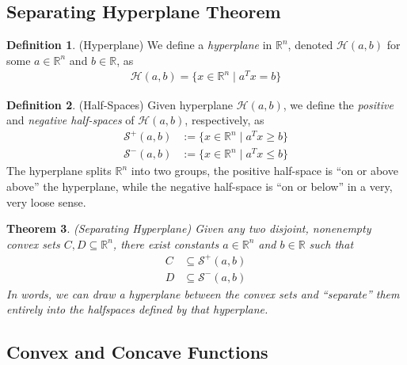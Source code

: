 \documentclass[12pt]{article}
\numberwithin{equation}{section} %
\theoremstyle{plain}
\newtheorem{thm}{Theorem}[section]
\theoremstyle{definition}
\newtheorem{defn}[thm]{Definition}
\theoremstyle{remark}
\newcommand{\R}{\mathbb{R}}
\newcommand{\Rn}{\mathbb{R}^n}
\begin{document}
\subsection{Separating Hyperplane Theorem}

\begin{defn}{(Hyperplane)}
We define a \emph{hyperplane} in $\Rn$, denoted $\mathcal{H}(a,b)$
for some $a\in \Rn$ and $b\in \R$, as
\begin{align*}
  \mathcal{H}(a,b) = \{x\in\Rn \; | \; a^Tx = b\}
\end{align*}
\end{defn}

\begin{defn}{(Half-Spaces)}
Given hyperplane $\mathcal{H}(a,b)$, we define the \emph{positive} and
\emph{negative half-spaces} of $\mathcal{H}(a,b)$, respectively, as
\begin{align*}
  \mathcal{S}^+(a,b)
  &:= \{ x \in \Rn \; |\; a^T x \geq b\} \\
  \mathcal{S}^-(a,b)
  &:= \{ x \in \Rn \; |\; a^T x \leq b\}
\end{align*}
The hyperplane splits $\Rn$ into two groups, the positive half-space is
``on or above above'' the hyperplane, while the negative half-space is
``on or below'' in a very, very loose sense.
\end{defn}

\begin{thm}{\emph{(Separating Hyperplane)}}
Given any two disjoint, nonenempty convex sets $C,D\subseteq\Rn$, there
exist constants $a\in\Rn$ and $b\in\R$ such that
\begin{align*}
  C &\subseteq \mathcal{S}^+(a,b) \\
  D &\subseteq \mathcal{S}^-(a,b)
\end{align*}
In words, we can draw a hyperplane between the convex sets and
``separate'' them entirely into the halfspaces defined by that
hyperplane.
\end{thm}


\subsection{Convex and Concave Functions}
\end{document}
